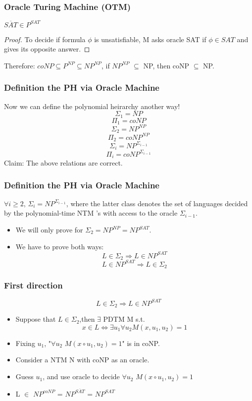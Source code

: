 \documentclass{beamer}
\begin{document}
\begin{frame}
\frametitle{Oracle Turing Machine (OTM)}
\begin{theorem}
	$\overline{SAT} \in P^{SAT}$
\end{theorem}
\begin{proof}
	To decide if formula $\phi$ is unsatisfiable, M asks oracle SAT if $\phi \in SAT$ and gives its opposite answer.
\end{proof}
Therefore: $coNP \subseteq P^{NP} \subseteq NP^{NP}$, if $NP^{NP}$ $\subseteq$ NP, then coNP $\subseteq$ NP.\\
\end{frame}

\begin{frame}
\frametitle{Definition the PH via Oracle Machine}
Now we can define the polynomial heirarchy another way!
$$
\Sigma_{1} = NP
$$
$$
\Pi_{1} = coNP
$$
$$
\Sigma_{2} = NP^{NP}
$$
$$
\Pi_{2} = coNP^{NP}
$$
$$
\Sigma_{i} = NP^{\Sigma_{i-1}}
$$
$$
\Pi_{i} = coNP^{\Sigma_{i-1}}
$$
Claim: The above relations are correct.
\end{frame}
\begin{frame}
\frametitle{Definition the PH via Oracle Machine}
\begin{theorem}
	$\forall i \geq 2$,  $\Sigma_{i} = NP^{\Sigma_{i-1}}$, where the latter class denotes the set of languages decided by the polynomial-time NTM ’s with access to the oracle $\Sigma_{i-1}$.

\end{theorem}
\begin{itemize}
	\item We will only prove for $\Sigma_{2} = NP^{NP} = NP^{SAT}$.
	\item We have to prove both ways:
	$$
	L \in \Sigma_{2} \Rightarrow L \in NP^{SAT}
	$$
	$$
	L \in NP^{SAT} \Rightarrow  L \in \Sigma_{2}
	$$
\end{itemize}
\end{frame}
\begin{frame}
\frametitle{First direction}
$$
L \in \Sigma_{2} \Rightarrow L \in NP^{SAT}
$$
\begin{itemize}
	\item Suppose that $L \in \Sigma_{2}$,then $\exists$ PDTM M s.t.
	$$
	x \in L \Leftrightarrow \exists u_{1} \forall u_{2} M(x, u_{1}, u_{2}) = 1
	$$
	\item Fixing $u_{1}$, "$\forall u_{2}$ $M(x \circ u_{1}, u_{2}) = 1$" is in coNP.
	\item Consider a NTM N with coNP as an oracle.
	\item Guess $u_{1}$,  and use oracle to decide $\forall u_{2}$ $M(x \circ u_{1}, u_{2}) = 1$
	\item L $\in$ $NP^{coNP}$ = $NP^{\overline{SAT}}$ = $NP^{SAT}$
\end{itemize}
\end{frame}
\end{document}
